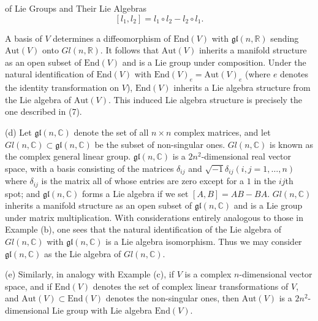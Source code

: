 \begin{examples}{of Lie Groups and Their Lie Algebras}
\[
[l_{1},l_{2}]=l_{1}\circ l_{2}-l_{2}\circ l_{1}.
\]

A basis of $V$ determines a diffeomorphism of $\mathrm{End}(V)$ with $\mathfrak{gl}(n, \mathbb{R})$ sending $\mathrm{Aut}(V)$ onto $Gl(n, \mathbb{R})$. It follows that $\mathrm{Aut}(V)$ inherits a manifold structure as an open subset of $\mathrm{End}(V)$ and is a Lie group under composition. Under the natural identification of $\mathrm{End}(V)$ with $\mathrm{End}(V)_e = \mathrm{Aut}(V)_e$ (where $e$ denotes the identity transformation on $V$), $\mathrm{End}(V)$ inherits a Lie algebra structure from the Lie algebra of $\mathrm{Aut}(V)$. This induced Lie algebra structure is precisely the one described in (7).

(d) Let $\mathfrak{gl}(n,\mathbb{C})$ denote the set of all $n\times n$ complex matrices, and let $Gl(n,\mathbb{C})\subset\mathfrak{gl}(n,\mathbb{C})$ be the subset of non-singular ones. $Gl(n,\mathbb{C})$ is known as the complex general linear group. $\mathfrak{gl}(n,\mathbb{C})$ is a $2n^{2}$-dimensional real vector space, with a basis consisting of the matrices $\delta_{ij}$ and $\sqrt{-1}\delta_{ij}(i,j=1,\ldots,n)$ where $\delta_{ij}$ is the matrix all of whose entries are zero except for a $1$ in the $ij$th spot; and $\mathfrak{gl}(n,\mathbb{C})$ forms a Lie algebra if we set $[A,B]=AB-BA$. $Gl(n,\mathbb{C})$ inherits a manifold structure as an open subset of $\mathfrak{gl}(n,\mathbb{C})$ and is a Lie group under matrix multiplication. With considerations entirely analogous to those in Example (b), one sees that the natural identification of the Lie algebra of $Gl(n,\mathbb{C})$ with $\mathfrak{gl}(n,\mathbb{C})$ is a Lie algebra isomorphism. Thus we may consider $\mathfrak{gl}(n,\mathbb{C})$ as the Lie algebra of $Gl(n,\mathbb{C})$. 

(e) Similarly, in analogy with Example (c), if $V$ is a complex $n$-dimensional vector space, and if $\mathrm{End}(V)$ denotes the set of complex linear transformations of $V$, and $\mathrm{Aut}(V) \subset \mathrm{End}(V)$ denotes the non-singular ones, then $\mathrm{Aut}(V)$ is a $2n^{2}$-dimensional Lie group with Lie algebra $\mathrm{End}(V)$. 

\end{examples}

